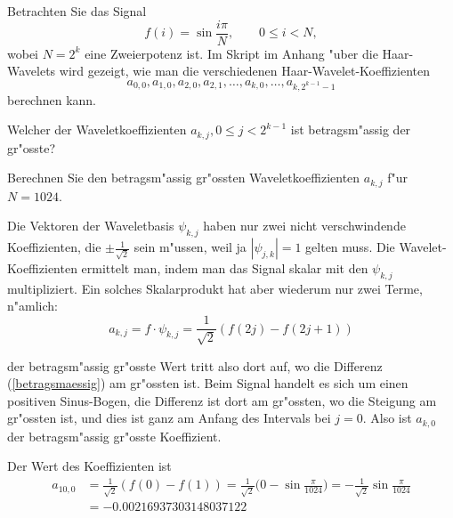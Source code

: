 Betrachten Sie das Signal
\[
f(i)=\sin\frac{i\pi}{N}, \qquad 0\le i<N,
\]
wobei $N=2^k$ eine Zweierpotenz ist.
Im Skript im Anhang "uber die Haar-Wavelets wird gezeigt,
wie man die verschiedenen Haar-Wavelet-Koeffizienten
$$a_{0,0},a_{1,0}, a_{2,0},a_{2,1},\dots ,a_{k,0},\dots, a_{k,2^{k-1}-1}$$
berechnen kann.
\begin{teilaufgaben}
\item
Welcher der Waveletkoeffizienten $a_{k,j}, 0\le j<2^{k-1}$ ist betragsm"assig
der gr"osste?
\item
Berechnen Sie den betragsm"assig gr"ossten Waveletkoeffizienten $a_{k,j}$
f"ur $N=1024$.
\end{teilaufgaben}

\begin{loesung}
Die Vektoren der Waveletbasis $\psi_{k,j}$ haben nur zwei nicht verschwindende
Koeffizienten, die $\pm\frac1{\sqrt{2}}$ sein m"ussen, weil ja $|\psi_{j,k}|=1$
gelten muss. Die Wavelet-Koeffizienten ermittelt man, indem man das Signal
skalar mit den $\psi_{k,j}$ multipliziert. Ein solches Skalarprodukt hat
aber wiederum nur zwei Terme, n"amlich:
\begin{equation}
a_{k,j}=f\cdot \psi_{k,j} = \frac1{\sqrt{2}}(f(2j)-f(2j+1))
\label{betragsmaessig}
\end{equation}
\begin{teilaufgaben}
\item der betragsm"assig gr"osste Wert tritt also dort auf, wo die Differenz
(\ref{betragsmaessig}) am gr"ossten ist. Beim Signal handelt es sich um
einen positiven Sinus-Bogen, die Differenz ist dort am gr"ossten, wo die
Steigung am gr"ossten ist, und dies ist ganz am Anfang des Intervals bei
$j=0$. Also ist $a_{k,0}$ der betragsm"assig gr"osste Koeffizient.
\item Der Wert des Koeffizienten ist
\begin{align*}
a_{10,0}&=\frac1{\sqrt{2}}(f(0)-f(1))=\frac1{\sqrt{2}}\biggl(0-\sin\frac{\pi}{1024}\biggr)
=-\frac1{\sqrt{2}}\sin\frac{\pi}{1024}\\
&=-0.00216937303148037122
\end{align*}
\end{teilaufgaben}
\end{loesung}

